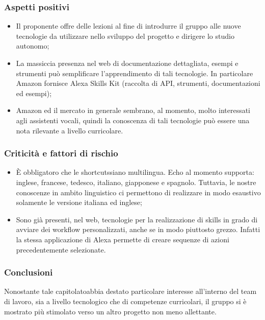 \subsubsection{Aspetti positivi}
\begin{itemize}
    \item Il proponente offre delle lezioni al fine di introdurre il gruppo alle 
nuove tecnologie da utilizzare nello sviluppo del progetto e dirigere lo studio 
autonomo;
    \item La massiccia presenza nel web di documentazione dettagliata, esempi e 
strumenti può semplificare l'apprendimento di tali tecnologie. In 
particolare Amazon fornisce Alexa Skills Kit (raccolta di API\glo, 
strumenti, documentazioni ed esempi);
    \item Amazon ed il mercato in generale sembrano, al momento, molto interessati 
agli assistenti vocali, quindi la conoscenza di tali tecnologie può essere una 
nota rilevante a livello curricolare.
\end{itemize}
\subsubsection{Criticità e fattori di rischio}
\begin{itemize}
    \item \`E obbligatoro che le shortcuts\glosp siano multilingua. Echo al momento 
supporta: inglese, francese, tedesco, italiano, giapponese e spagnolo. Tuttavia, 
le nostre conoscenze in ambito linguistico ci permettono di realizzare in modo 
esaustivo solamente le versione italiana ed inglese;
    \item Sono già presenti, nel web, tecnologie per la realizzazione di skills\glo{} in 
    grado di avviare dei workflow\glo{} personalizzati, anche se in modo piuttosto grezzo.
    Infatti la stessa applicazione di Alexa permette di creare sequenze di azioni precedentemente selezionate.
 
\end{itemize}
\subsubsection{Conclusioni}
Nonostante tale capitolato\glosp abbia destato particolare interesse all'interno del 
team di lavoro, sia a livello tecnologico che di competenze curricolari, il 
gruppo si è mostrato più stimolato verso un altro progetto non meno allettante.


